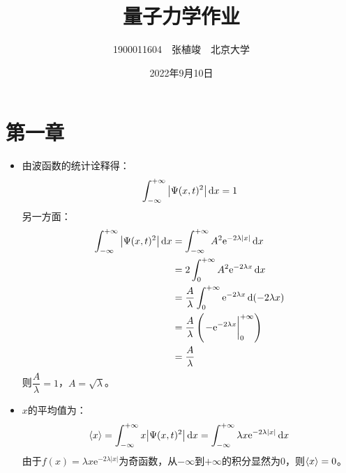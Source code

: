 \documentclass[a4paper,fontset=none]{ctexart}
\title{\textbf{量子力学作业}}
\author{1900011604\ \ 张植竣\ \ 北京大学}
\date{2022年9月10日}
\begin{document}
\maketitle

    \section*{第一章}

    \begin{itemize}
        \item[5.(a)]
        由波函数的统计诠释得：
        \[
            \int_{-\infty}^{+\infty} \abs{\Psi(x,t)^2} \dd{x} = 1
        \]
        另一方面：
        \begin{align*}
            \int_{-\infty}^{+\infty} \abs{\Psi(x,t)^2} \dd{x}
            &= \int_{-\infty}^{+\infty} A^2 \mathrm{e}^{-2\lambda|x|} \dd{x} \\
            &= 2 \int_{0}^{+\infty} A^2 \mathrm{e}^{-2\lambda x} \dd{x} \\
            &= \frac{A}{\lambda} \int_{0}^{+\infty} \mathrm{e}^{-2\lambda x} \dd(-2\lambda x) \\
            &= \frac{A}{\lambda} \left(\eval{-\mathrm{e}^{-2\lambda x}}_{0}^{+\infty}\right) \\
            &= \frac{A}{\lambda}
        \end{align*}
        则$\dfrac{A}{\lambda} = 1$，$A = \sqrt{\lambda}$。

        \item[5.(b)]
        $x$的平均值为：
        \[
            \expval{x}
            = \int_{-\infty}^{+\infty} x \abs{\Psi(x,t)^2} \dd{x}
            = \int_{-\infty}^{+\infty} \lambda x \mathrm{e}^{-2\lambda|x|} \dd{x}
        \]
        由于$f(x) = \lambda x \mathrm{e}^{-2\lambda|x|}$为奇函数，从$-\infty$到$+\infty$的积分显然为0，则$\expval{x} = 0$。


\end{itemize}
\end{document}
